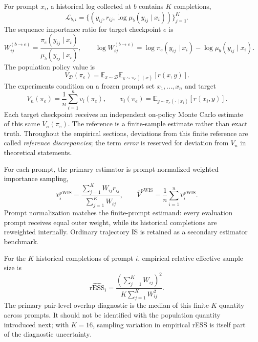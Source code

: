 \documentclass[10pt]{article}
\theoremstyle{remark}
\newcommand{\E}{\mathbb{E}}
\newcommand{\rESS}{\mathrm{rESS}}
\newcommand{\pWIS}{\mathrm{pWIS}}
\begin{document}
For prompt $x_i$, a historical log collected at $b$ contains $K$ completions,
\begin{equation}
\mathcal L_{b,i}=\{(y_{ij},r_{ij},\log\mu_b(y_{ij}\mid x_i))\}_{j=1}^{K}.
\end{equation}
The sequence importance ratio for target checkpoint $e$ is
\begin{equation}
W_{ij}^{(b\to e)}=\frac{\pi_e(y_{ij}\mid x_i)}{\mu_b(y_{ij}\mid x_i)},\qquad
\log W_{ij}^{(b\to e)}=\log\pi_e(y_{ij}\mid x_i)-\log\mu_b(y_{ij}\mid x_i).
\end{equation}
The population policy value is
\begin{equation}
V_{\mathcal D}(\pi_e)=\E_{x\sim\mathcal D}\E_{y\sim\pi_e(\cdot\mid x)}[r(x,y)].
\end{equation}
The experiments condition on a frozen prompt set $x_1,\ldots,x_n$ and target
\begin{equation}
V_n(\pi_e)=\frac1n\sum_{i=1}^{n}v_i(\pi_e),\qquad
v_i(\pi_e)=\E_{y\sim\pi_e(\cdot\mid x_i)}[r(x_i,y)].
\end{equation}
Each target checkpoint receives an independent on-policy Monte Carlo estimate of this same $V_n(\pi_e)$. The reference is a finite-sample estimate rather than exact truth. Throughout the empirical sections, deviations from this finite reference are called \emph{reference discrepancies}; the term \emph{error} is reserved for deviation from $V_n$ in theoretical statements.

For each prompt, the primary estimator is prompt-normalized weighted importance sampling,
\begin{equation}
\widehat v_i^{\pWIS}=\frac{\sum_{j=1}^{K}W_{ij}r_{ij}}{\sum_{j=1}^{K}W_{ij}},\qquad
\widehat V^{\pWIS}=\frac1n\sum_{i=1}^{n}\widehat v_i^{\pWIS}.
\end{equation}
Prompt normalization matches the finite-prompt estimand: every evaluation prompt receives equal outer weight, while its historical completions are reweighted internally. Ordinary trajectory IS is retained as a secondary estimator benchmark.

For the $K$ historical completions of prompt $i$, empirical relative effective sample size is
\begin{equation}
\widehat{\rESS}_i=\frac{\left(\sum_{j=1}^{K}W_{ij}\right)^2}{K\sum_{j=1}^{K}W_{ij}^2}.
\end{equation}
The primary pair-level overlap diagnostic is the median of this finite-$K$ quantity across prompts. It should not be identified with the population quantity introduced next; with $K=16$, sampling variation in empirical rESS is itself part of the diagnostic uncertainty.
\end{document}
